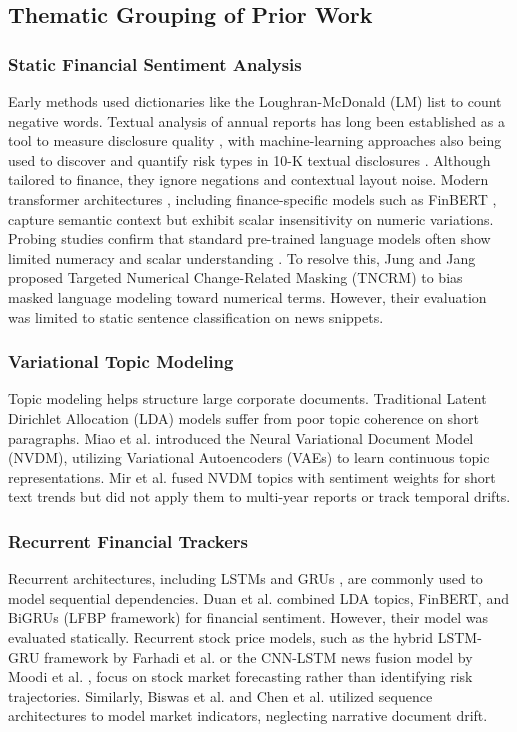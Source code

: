 \documentclass[journal]{IEEEtran}
\begin{document}
\subsection{Thematic Grouping of Prior Work}
\subsubsection{Static Financial Sentiment Analysis}
Early methods used dictionaries like the Loughran-McDonald (LM) list \cite{loughran2011} to count negative words. Textual analysis of annual reports has long been established as a tool to measure disclosure quality \cite{li2010}, with machine-learning approaches also being used to discover and quantify risk types in 10-K textual disclosures \cite{bao2014}. Although tailored to finance, they ignore negations and contextual layout noise. Modern transformer architectures \cite{vaswani2017}, including finance-specific models such as FinBERT \cite{araci2019}, capture semantic context but exhibit scalar insensitivity on numeric variations. Probing studies confirm that standard pre-trained language models often show limited numeracy and scalar understanding \cite{wallace2019, thawani2021}. To resolve this, Jung and Jang \cite{jung2024} proposed Targeted Numerical Change-Related Masking (TNCRM) to bias masked language modeling toward numerical terms. However, their evaluation was limited to static sentence classification on news snippets.

\subsubsection{Variational Topic Modeling}
Topic modeling helps structure large corporate documents. Traditional Latent Dirichlet Allocation (LDA) models \cite{blei2003} suffer from poor topic coherence on short paragraphs. Miao et al. \cite{miao2016} introduced the Neural Variational Document Model (NVDM), utilizing Variational Autoencoders (VAEs) \cite{kingma2013} to learn continuous topic representations. Mir et al. \cite{mir2025} fused NVDM topics with sentiment weights for short text trends but did not apply them to multi-year reports or track temporal drifts.

\subsubsection{Recurrent Financial Trackers}
Recurrent architectures, including LSTMs \cite{hochreiter1997} and GRUs \cite{cho2014}, are commonly used to model sequential dependencies. Duan et al. \cite{duan2024} combined LDA topics, FinBERT, and BiGRUs (LFBP framework) for financial sentiment. However, their model was evaluated statically. Recurrent stock price models, such as the hybrid LSTM-GRU framework by Farhadi et al. \cite{farhadi2025} or the CNN-LSTM news fusion model by Moodi et al. \cite{moodi2024}, focus on stock market forecasting rather than identifying risk trajectories. Similarly, Biswas et al. \cite{biswas2025} and Chen et al. \cite{chen2024} utilized sequence architectures to model market indicators, neglecting narrative document drift.
\end{document}
